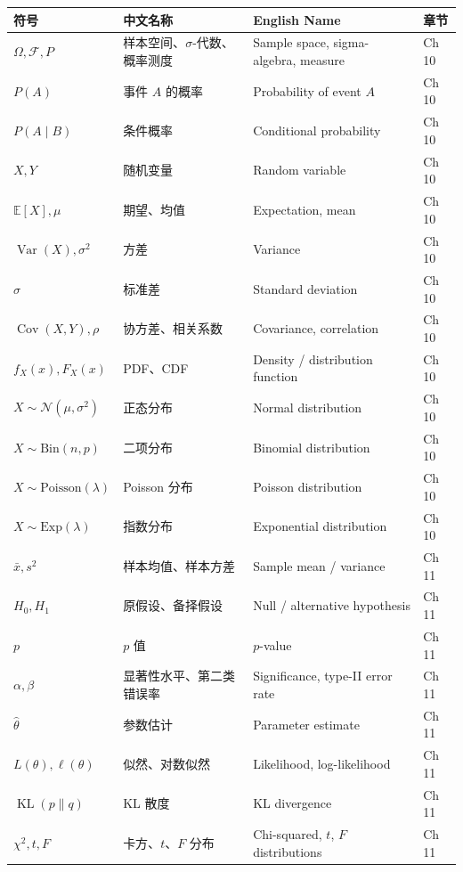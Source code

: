 \begin{center}
\renewcommand{\arraystretch}{1.25}
\begin{tabular}{@{}llll@{}}
\toprule
\textbf{符号} & \textbf{中文名称} & \textbf{English Name} & \textbf{章节} \\
\midrule
$\Omega, \mathcal{F}, P$ & 样本空间、$\sigma$-代数、概率测度 & Sample space, sigma-algebra, measure & Ch 10 \\
$P(A)$ & 事件 $A$ 的概率 & Probability of event $A$ & Ch 10 \\
$P(A \mid B)$ & 条件概率 & Conditional probability & Ch 10 \\
$X, Y$ & 随机变量 & Random variable & Ch 10 \\
$\mathbb{E}[X], \mu$ & 期望、均值 & Expectation, mean & Ch 10 \\
$\operatorname{Var}(X), \sigma^2$ & 方差 & Variance & Ch 10 \\
$\sigma$ & 标准差 & Standard deviation & Ch 10 \\
$\operatorname{Cov}(X,Y), \rho$ & 协方差、相关系数 & Covariance, correlation & Ch 10 \\
$f_X(x), F_X(x)$ & PDF、CDF & Density / distribution function & Ch 10 \\
$X \sim \mathcal{N}(\mu, \sigma^2)$ & 正态分布 & Normal distribution & Ch 10 \\
$X \sim \mathrm{Bin}(n,p)$ & 二项分布 & Binomial distribution & Ch 10 \\
$X \sim \mathrm{Poisson}(\lambda)$ & Poisson 分布 & Poisson distribution & Ch 10 \\
$X \sim \mathrm{Exp}(\lambda)$ & 指数分布 & Exponential distribution & Ch 10 \\
$\bar{x}, s^2$ & 样本均值、样本方差 & Sample mean / variance & Ch 11 \\
$H_0, H_1$ & 原假设、备择假设 & Null / alternative hypothesis & Ch 11 \\
$p$ & $p$ 值 & $p$-value & Ch 11 \\
$\alpha, \beta$ & 显著性水平、第二类错误率 & Significance, type-II error rate & Ch 11 \\
$\hat{\theta}$ & 参数估计 & Parameter estimate & Ch 11 \\
$L(\theta), \ell(\theta)$ & 似然、对数似然 & Likelihood, log-likelihood & Ch 11 \\
$\operatorname{KL}(p \| q)$ & KL 散度 & KL divergence & Ch 11 \\
$\chi^2, t, F$ & 卡方、$t$、$F$ 分布 & Chi-squared, $t$, $F$ distributions & Ch 11 \\
\bottomrule
\end{tabular}
\end{center}

